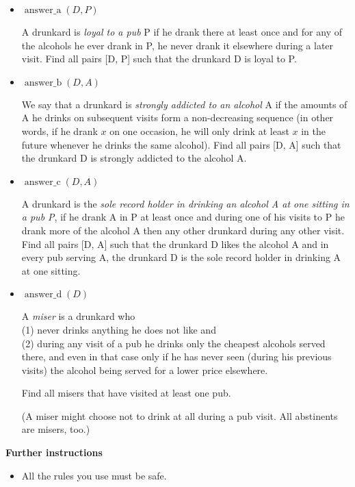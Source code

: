 \documentclass[10pt, a4paper]{article}
\DeclareMathOperator{\answera}{answer\_a}
\DeclareMathOperator{\answerb}{answer\_b}
\DeclareMathOperator{\answerc}{answer\_c}
\DeclareMathOperator{\answerd}{answer\_d}
\begin{document}
\begin{itemize}
\item $\answera(D, P)$

A drunkard is \emph{loyal to a pub} P if he drank there at least once and for any of the alcohols he ever drank in P, he never drank it elsewhere during a later visit. Find all pairs [D, P] such that the drunkard D is loyal to P.

\item $\answerb(D, A)$

We say that a drunkard is \emph{strongly addicted to an alcohol} A if the amounts of A he drinks on subsequent visits form a non-decreasing sequence (in other words, if he drank $x$ on one occasion, he will only drink at least $x$ in the future whenever he drinks the same alcohol). Find all pairs [D, A] such that the drunkard D is strongly addicted to the alcohol A.

\item $\answerc(D, A)$

A drunkard is the \emph{sole record holder in drinking an alcohol A at one sitting in a pub P}, if he drank A in P at least once and during one of his visits to P he drank more of the alcohol A then any other drunkard during any other visit. Find all pairs [D, A] such that the drunkard D likes the alcohol A and in every pub serving A, the drunkard D is the sole record holder in drinking A at one sitting.

\item $\answerd(D)$

A \emph{miser} is a drunkard who\\
(1) never drinks anything he does not like and\\
(2) during any visit of a pub he drinks only the cheapest alcohols served there, and even in that case only if he has never seen (during his previous visits) the alcohol being served for a lower price elsewhere.

Find all misers that have visited at least one pub.

(A miser might choose not to drink at all during a pub visit. All abstinents are misers, too.)
\end{itemize}

\bigskip
\bigskip

\centerline{\bf\large Further instructions}

\bigskip

\begin{itemize}
\item All the rules you use must be safe.
\end{itemize}
\end{document}
